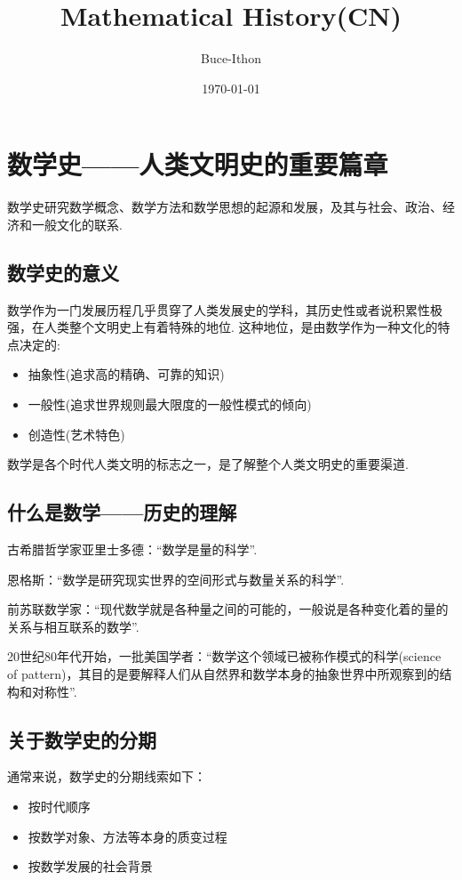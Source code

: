 \documentclass{Math_Note}
\title{Mathematical History(CN)}
\author{Buce-Ithon}
\date{\today}
\begin{document}
\maketitle

\newpage
\tableofcontents
\newpage

\section{数学史——人类文明史的重要篇章}
数学史研究数学概念、数学方法和数学思想的起源和发展，及其与社会、政治、经济和一般文化的联系.
\subsection{数学史的意义}
数学作为一门发展历程几乎贯穿了人类发展史的学科，其历史性或者说积累性极强，在人类整个文明史上有着特殊的地位.
这种地位，是由数学作为一种文化的特点决定的:
\begin{itemize}
    \item 抽象性(追求高的精确、可靠的知识)
    \item 一般性(追求世界规则最大限度的一般性模式的倾向)
    \item 创造性(艺术特色)
\end{itemize}
数学是各个时代人类文明的标志之一，是了解整个人类文明史的重要渠道.
\subsection{什么是数学——历史的理解}
古希腊哲学家亚里士多德：“数学是量的科学”.

恩格斯：“数学是研究现实世界的空间形式与数量关系的科学”.

前苏联数学家：“现代数学就是各种量之间的可能的，一般说是各种变化着的量的关系与相互联系的数学”.

20世纪80年代开始，一批美国学者：“数学这个领域已被称作模式的科学(science of pattern)，其目的是要解释人们从自然界和数学本身的抽象世界中所观察到的结构和对称性”.
\subsection{关于数学史的分期}
通常来说，数学史的分期线索如下：
\begin{itemize}
    \item 按时代顺序
    \item 按数学对象、方法等本身的质变过程
    \item 按数学发展的社会背景
\end{itemize}
\end{document}
